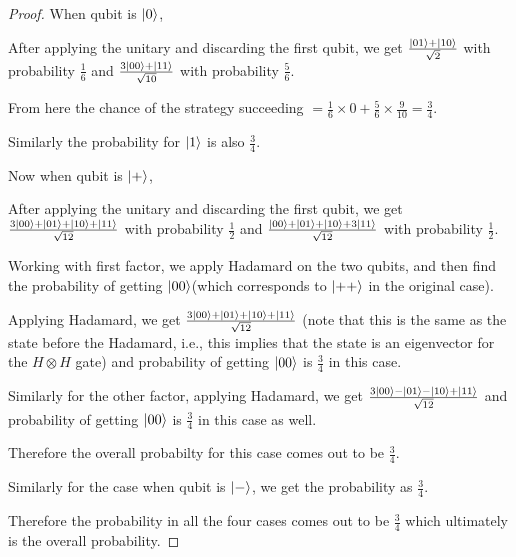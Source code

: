 \begin{solution}[label=ques:5]
\begin{proof}
    When qubit is $\ket{0}$,

    After applying the unitary and discarding the first qubit, we get $\frac{\ket{01}+\ket{10}}{\sqrt{2}}$ with probability $\frac{1}{6}$ and $\frac{3\ket{00}+\ket{11}}{\sqrt{10}}$ with probability $\frac{5}{6}$.
    
    From here the chance of the strategy succeeding $=\frac{1}{6}\times 0 + \frac{5}{6}\times\frac{9}{10} = \frac{3}{4}$.

    Similarly the probability for $\ket{1}$ is also $\frac{3}{4}$.\newline

    Now when qubit is $\ket{+}$,

    After applying the unitary and discarding the first qubit, we get $\frac{3\ket{00}+\ket{01}+\ket{10}+\ket{11}}{\sqrt{12}}$ with probability $\frac{1}{2}$ and $\frac{\ket{00}+\ket{01}+\ket{10}+3\ket{11}}{\sqrt{12}}$ with probability $\frac{1}{2}$. 

    Working with first factor, we apply Hadamard on the two qubits, and then find the probability of getting $\ket{00}$(which corresponds to $\ket{++}$ in the original case).

    Applying Hadamard, we get $\frac{3\ket{00}+\ket{01}+\ket{10}+\ket{11}}{\sqrt{12}}$ (note that this is the same as the state before the Hadamard, i.e., this implies that the state is an eigenvector for the $H\otimes H$ gate) and probability of getting $\ket{00}$ is $\frac{3}{4}$ in this case.
    
    Similarly for the other factor, applying Hadamard, we get $\frac{3\ket{00}-\ket{01}-\ket{10}+\ket{11}}{\sqrt{12}}$ and probability of getting $\ket{00}$ is $\frac{3}{4}$ in this case as well.

    Therefore the overall probabilty for this case comes out to be $\frac{3}{4}$.

    Similarly for the case when qubit is $\ket{-}$, we get the probability as $\frac{3}{4}$.

    Therefore the probability in all the four cases comes out to be $\frac{3}{4}$ which ultimately is the overall probability.
  \end{proof}
\end{solution}
